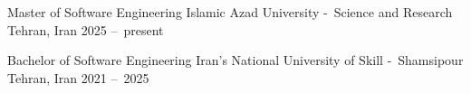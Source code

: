 

\begin{cventries}

  \cventry
    {Master of Software Engineering}
    {Islamic Azad University -\ Science and Research}
    {Tehran, Iran}
    {2025 --\ present}
    {}

  \cventry
    {Bachelor of Software Engineering}
    {Iran's National University of Skill -\ Shamsipour}
    {Tehran, Iran}
    {2021 --\ 2025}
    {}

\end{cventries}
